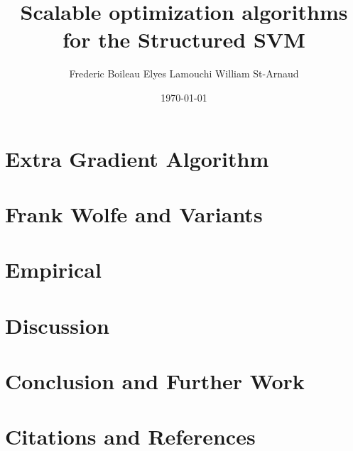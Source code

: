 

\usepackage[
  backend=biber,
  style=numeric,
  citestyle=numeric
]{biblatex}

\title{Scalable optimization algorithms for the Structured SVM}
\date{\today}
\author{Frederic Boileau Elyes Lamouchi William St-Arnaud}

\maketitle

\section{Extra Gradient Algorithm}

\section{Frank Wolfe and Variants}

\section{Empirical}

\section{Discussion}

\section{Conclusion and Further Work}


\clearpage
\section{Citations and References}
\printbibliography

